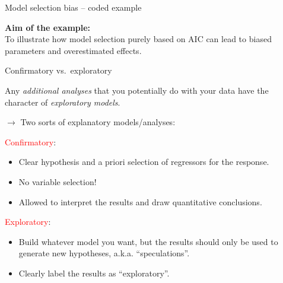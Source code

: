 \documentclass[
  10pt,
  ignorenonframetext,
]{beamer}
\begin{document}
\begin{frame}
\begin{block}{Model selection bias -- coded example}
\protect\hypertarget{model-selection-bias-coded-example}{}
\(~\)

\begin{tcolorbox}
{\bf Aim of the example:} \\
To illustrate how model selection purely based on AIC can lead to biased parameters and overestimated effects.

\end{tcolorbox}
\end{block}
\end{frame}

\begin{frame}
\begin{block}{Confirmatory vs.~exploratory}
\protect\hypertarget{confirmatory-vs.-exploratory}{}
\(~\)

Any \emph{additional analyses} that you potentially do with your data
have the character of \emph{exploratory models}.

\vspace{2mm}

\(\rightarrow\) Two sorts of explanatory models/analyses:

\vspace{2mm}

\textcolor{red}{Confirmatory}:

\begin{tcolorbox}

\begin{itemize}
\item Clear hypothesis and a priori  selection of regressors for the response. 
\item No variable selection! 
\item Allowed to interpret the results and draw quantitative conclusions.  
\end{itemize}

\end{tcolorbox}

\pause

\textcolor{red}{Exploratory}:

\begin{tcolorbox}
\begin{itemize}
\item Build whatever model you want, but the results should only be used to generate new hypotheses, a.k.a. ``speculations''.
 \item Clearly label the results as ``exploratory''.
\end{itemize}
    
\end{tcolorbox}
\end{block}
\end{frame}
\end{document}
